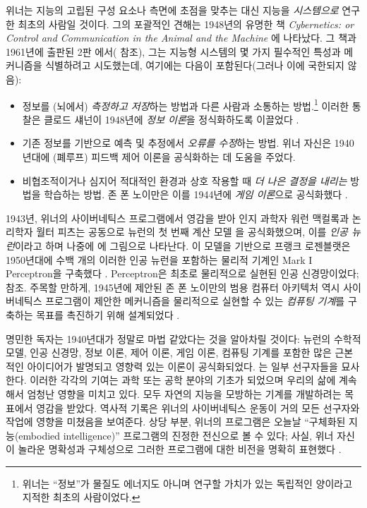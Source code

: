 \documentclass[../../book-main_ko.tex]{subfiles}
\begin{document}
위너는 지능의 고립된 구성 요소나 측면에 초점을 맞추는 대신 지능을 \textit{시스템으로} 연구한 최초의 사람일 것이다. 그의 포괄적인 견해는 1948년의 유명한 책 \textit{Cybernetics: or Control and Communication in the Animal and the Machine} \cite{Wiener-Cybernetics-1948}에 나타났다. 그 책과 1961년에 출판된 2판 \cite{Wiener-Cybernetics-1961}에서( 참조), 그는 지능형 시스템의 몇 가지 필수적인 특성과 메커니즘을 식별하려고 시도했는데, 여기에는 다음이 포함된다(그러나 이에 국한되지 않음):
\begin{itemize}
    \item 정보를 (뇌에서) \textit{측정하고 저장}하는 방법과 다른 사람과 소통하는 방법.\footnote{위너는 ``정보''가 물질도 에너지도 아니며 연구할 가치가 있는 독립적인 양이라고 지적한 최초의 사람이었다.} 이러한 통찰은 클로드 섀넌이 1948년에 \textit{정보 이론}을 정식화하도록 이끌었다 \cite{Shannon-1948}.
    \item 기존 정보를 기반으로 예측 및 추정에서 \textit{오류를 수정}하는 방법. 위너 자신은 1940년대에 (폐루프) 피드백 제어 이론을 공식화하는 데 도움을 주었다.
    \item 비협조적이거나 심지어 적대적인 환경과 상호 작용할 때 \textit{더 나은 결정을 내리는} 방법을 학습하는 방법. 존 폰 노이만은 이를 1944년에 \textit{게임 이론}으로 공식화했다 \cite{von-Neumann-1944}.
\end{itemize}
1943년, 위너의 사이버네틱스 프로그램에서 영감을 받아 인지 과학자 워런 맥컬록과 논리학자 월터 피츠는 공동으로 뉴런의 첫 번째 계산 모델 \cite{McCulloch-Pitts}을 공식화했으며, 이를 \textit{인공 뉴런}이라고 하며 나중에 에 그림으로 나타난다. 이 모델을 기반으로 프랭크 로젠블랫은 1950년대에 수백 개의 이러한 인공 뉴런을 포함하는 물리적 기계인 Mark I Perceptron을 구축했다 \cite{Rosenblatt:1957}. Perceptron은 최초로 물리적으로 실현된 인공 신경망이었다;  참조. 주목할 만하게, 1945년에 제안된 존 폰 노이만의 범용 컴퓨터 아키텍처 역시 사이버네틱스 프로그램이 제안한 메커니즘을 물리적으로 실현할 수 있는 \textit{컴퓨팅 기계}를 구축하는 목표를 촉진하기 위해 설계되었다 \cite{von-Neumann-1958}.

명민한 독자는 1940년대가 정말로 마법 같았다는 것을 알아차릴 것이다: 뉴런의 수학적 모델, 인공 신경망, 정보 이론, 제어 이론, 게임 이론, 컴퓨팅 기계를 포함한 많은 근본적인 아이디어가 발명되고 영향력 있는 이론이 공식화되었다. 는 일부 선구자들을 묘사한다. 이러한 각각의 기여는 과학 또는 공학 분야의 기초가 되었으며 우리의 삶에 계속해서 엄청난 영향을 미치고 있다. 모두 자연의 지능을 모방하는 기계를 개발하려는 목표에서 영감을 받았다. 역사적 기록은 위너의 사이버네틱스 운동이 거의 모든 선구자와 작업에 영향을 미쳤음을 보여준다. 상당 부분, 위너의 프로그램은 오늘날 ``구체화된 지능(embodied intelligence)'' 프로그램의 진정한 전신으로 볼 수 있다; 사실, 위너 자신이 놀라운 명확성과 구체성으로 그러한 프로그램에 대한 비전을 명확히 표현했다 \cite{Wiener-Cybernetics-1961}.
\end{document}
